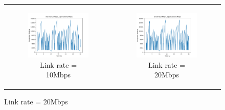 \documentclass[11pt]{article}
\begin{document}
\begin{figure}[H]
\begin{tabular}[c]{cc}
    \begin{subfigure}[c]{0.5\textwidth}
      \centering
      \includegraphics[width=\textwidth]{Q2/outputs/channel10Mbps_application2Mbps.png}
      \caption{Link rate = 10Mbps}
    \end{subfigure}&

    \begin{subfigure}[c]{0.5\textwidth}
      \centering
      \includegraphics[width=\textwidth]{Q2/outputs/channel20Mbps_application2Mbps.png}
      \caption{Link rate = 20Mbps}
    \end{subfigure}\\


\end{tabular}
\end{figure}
\end{document}
